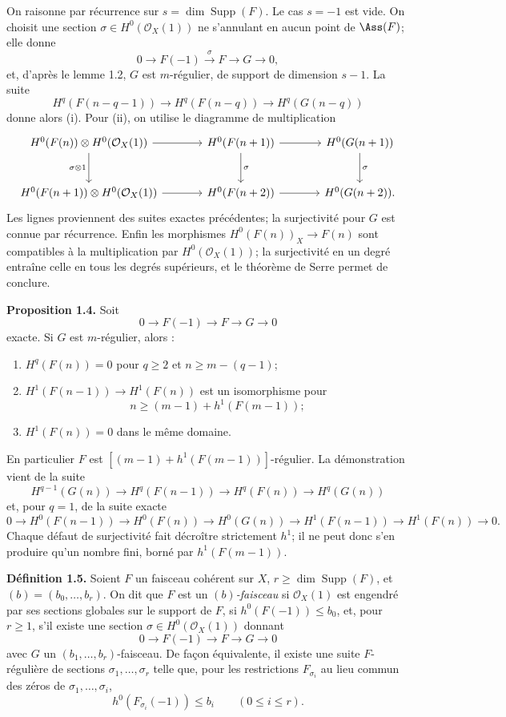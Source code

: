 \documentclass[11pt]{article}
\begin{document}
On raisonne par r\'ecurrence sur $s=\dim\operatorname{Supp}(F)$. Le cas $s=-1$ est vide. On choisit une section $\sigma\in H^0(\mathcal O_X(1))$ ne s'annulant en aucun point de $\Ass(F)$; elle donne
\[
0\longrightarrow F(-1)\xrightarrow{\sigma}F\longrightarrow G\longrightarrow 0,
\]
et, d'apr\`es le lemme 1.2, $G$ est $m$-r\'egulier, de support de dimension $s-1$. La suite
\[
H^q(F(n-q-1))\longrightarrow H^q(F(n-q))\longrightarrow H^q(G(n-q))
\]
donne alors (i). Pour (ii), on utilise le diagramme de multiplication
\[
\begin{tikzcd}[column sep=large,row sep=large]
H^0(F(n))\otimes H^0(\mathcal O_X(1)) \arrow[r] \arrow[d,"\sigma\otimes 1"'] & H^0(F(n+1)) \arrow[r] \arrow[d,"\sigma"] & H^0(G(n+1)) \arrow[d,"\sigma"] \\
H^0(F(n+1))\otimes H^0(\mathcal O_X(1)) \arrow[r] & H^0(F(n+2)) \arrow[r] & H^0(G(n+2)).
\end{tikzcd}
\]
Les lignes proviennent des suites exactes pr\'ec\'edentes; la surjectivit\'e pour $G$ est connue par r\'ecurrence. Enfin les morphismes $H^0(F(n))_X\to F(n)$ sont compatibles \`a la multiplication par $H^0(\mathcal O_X(1))$; la surjectivit\'e en un degr\'e entra\^ine celle en tous les degr\'es sup\'erieurs, et le th\'eor\`eme de Serre permet de conclure.

\textbf{Proposition 1.4.} Soit
\[
0\longrightarrow F(-1)\longrightarrow F\longrightarrow G\longrightarrow 0
\]
exacte. Si $G$ est $m$-r\'egulier, alors :
\begin{enumerate}[label=\roman*)]
\item $H^q(F(n))=0$ pour $q\ge2$ et $n\ge m-(q-1)$;
\item $H^1(F(n-1))\to H^1(F(n))$ est un isomorphisme pour
\[
 n\ge (m-1)+h^1(F(m-1));
\]
\item $H^1(F(n))=0$ dans le m\^eme domaine.
\end{enumerate}
En particulier $F$ est $[(m-1)+h^1(F(m-1))]$-r\'egulier. La d\'emonstration vient de la suite
\[
H^{q-1}(G(n))\to H^q(F(n-1))\to H^q(F(n))\to H^q(G(n))
\]
et, pour $q=1$, de la suite exacte
\[
0\to H^0(F(n-1))\to H^0(F(n))\to H^0(G(n))\to H^1(F(n-1))\to H^1(F(n))\to0.
\]
Chaque d\'efaut de surjectivit\'e fait d\'ecro\^itre strictement $h^1$; il ne peut donc s'en produire qu'un nombre fini, born\'e par $h^1(F(m-1))$.

\textbf{D\'efinition 1.5.} Soient $F$ un faisceau coh\'erent sur $X$, $r\ge\dim\operatorname{Supp}(F)$, et $(b)=(b_0,\ldots,b_r)$. On dit que $F$ est un \emph{$(b)$-faisceau} si $\mathcal O_X(1)$ est engendr\'e par ses sections globales sur le support de $F$, si $h^0(F(-1))\le b_0$, et, pour $r\ge1$, s'il existe une section $\sigma\in H^0(\mathcal O_X(1))$ donnant
\[
0\to F(-1)\to F\to G\to0
\]
avec $G$ un $(b_1,\ldots,b_r)$-faisceau. De fa\c con \'equivalente, il existe une suite $F$-r\'eguli\`ere de sections $\sigma_1,\ldots,\sigma_r$ telle que, pour les restrictions $F_{\sigma_i}$ au lieu commun des z\'eros de $\sigma_1,\ldots,\sigma_i$,
\[
 h^0(F_{\sigma_i}(-1))\le b_i\qquad(0\le i\le r).
\]
\end{document}
